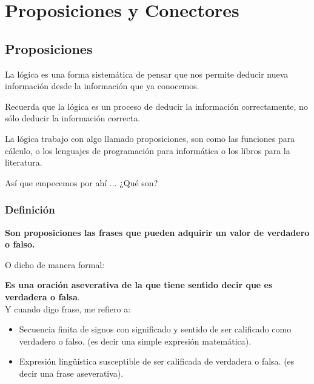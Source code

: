 \documentclass[12pt]{report}                                    %
\begin{document}
    \chapter{Proposiciones y Conectores}
        \clearpage

        \section{Proposiciones}

            La lógica es una forma sistemática de pensar que nos permite deducir nueva información desde la
            información que ya conocemos.

            Recuerda que la lógica es un proceso de deducir la información correctamente,
            no sólo deducir la información correcta.

            La lógica trabajo con algo llamado proposiciones, son como las funciones para
            cálculo, o los lenguajes de programación para informática o los libros para la literatura.

            Así que empecemos por ahí ... ¿Qué son?


            \subsection*{Definición}
                
                \textbf{Son proposiciones las frases que pueden adquirir un valor de verdadero o falso.}
                
                O dicho de manera formal:

                \textbf{Es una oración aseverativa de la que tiene sentido decir que es verdadera o falsa}.\\

                Y cuando digo frase, me refiero a:
                \begin{itemize}
                    \item Secuencia finita de signos con significado y sentido de ser calificado como verdadero o falso.
                            (es decir una simple expresión matemática).

                    \item Expresión lingüística susceptible de ser calificada de verdadera o falsa.
                            (es decir una frase aseverativa).
                \end{itemize}
\end{document}
